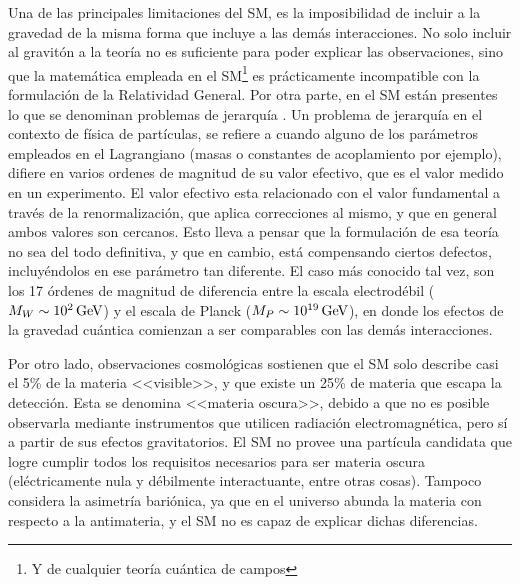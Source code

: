 Una de las principales limitaciones del SM, es la imposibilidad de incluir a la gravedad de la misma forma que incluye a las demás interacciones. No solo incluir al gravitón a la teoría no es suficiente para poder explicar las observaciones, sino que la matemática empleada en el SM\footnote{Y de cualquier teoría cuántica de campos} es prácticamente incompatible con la formulación de la Relatividad General. Por otra parte, en el SM están presentes lo que se denominan problemas de jerarquía \cite{tHooft:1980xss}. 
Un problema de jerarquía en el contexto de física de partículas, se refiere a cuando alguno de los parámetros empleados en el Lagrangiano (masas o constantes de acoplamiento por ejemplo), difiere en varios ordenes de magnitud de su valor efectivo, que es el valor medido en un experimento. El valor efectivo esta relacionado con el valor fundamental a través de la renormalización, que aplica correcciones al mismo, y que en general ambos valores son cercanos.
Esto lleva a pensar que la formulación de esa teoría no sea del todo definitiva, y que en cambio, está compensando ciertos defectos, incluyéndolos en ese parámetro tan diferente. 
El caso más conocido tal vez, son los 17 órdenes de magnitud de diferencia entre la escala electrodébil ($M_W\sim 10^{2}\,\text{GeV}$) y el escala de Planck ($M_P\sim 10^{19}\,\text{GeV}$), en donde los efectos de la gravedad cuántica comienzan a ser comparables con las demás interacciones.

Por otro lado, observaciones cosmológicas sostienen que el SM solo describe casi el 5\% de la materia <<visible>>, y que existe un 25\% de materia que escapa la detección. Esta se denomina <<materia oscura>>, debido a que no es posible observarla mediante instrumentos que utilicen radiación electromagnética, pero sí a partir de sus efectos gravitatorios. El SM no provee una partícula candidata que logre cumplir todos los requisitos necesarios para ser materia oscura (eléctricamente nula y débilmente interactuante, entre otras cosas). Tampoco considera la asimetría bariónica, ya que en el universo abunda la materia con respecto a la antimateria, y el SM no es capaz de explicar dichas diferencias.

